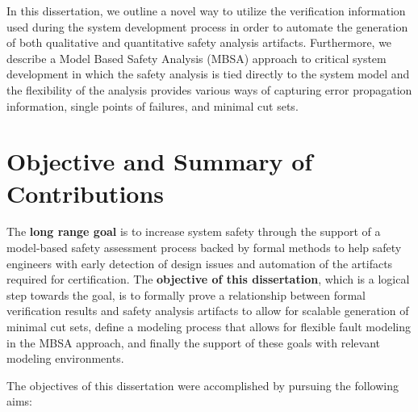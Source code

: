 
In this dissertation, we outline a novel way to utilize the verification information used during the system development process in order to automate the generation of both qualitative and quantitative safety analysis artifacts. Furthermore, we describe a Model Based Safety Analysis (MBSA) approach to critical system development in which the safety analysis is tied directly to the system model and the flexibility of the analysis provides various ways of capturing error propagation information, single points of failures, and minimal cut sets.


\section{Objective and Summary of Contributions}
The \textbf{long range goal} is to increase system safety through the support of a model-based safety assessment process backed by formal methods to help safety engineers with early detection of design issues and automation of the artifacts required for certification. The \textbf{objective of this dissertation}, which is a logical step towards the goal, is to formally prove a relationship between formal verification results and safety analysis artifacts to allow for scalable generation of minimal cut sets, define a modeling process that allows for flexible fault modeling in the MBSA approach, and finally the support of these goals with relevant modeling environments.

The objectives of this dissertation were accomplished by pursuing the following aims: 

